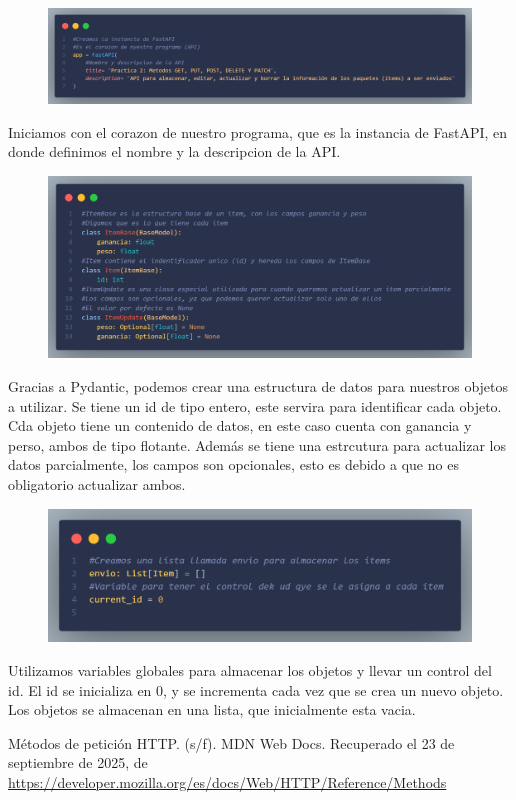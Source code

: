 \documentclass[12pt]{article}
\begin{document}
\begin{figure}[h!]
    \centering
    \includegraphics[width=1\textwidth]{Imagenes/Captura2_corazon del programa.png}
\end{figure}

Iniciamos con el corazon de nuestro programa, que es la instancia de FastAPI, en donde definimos el nombre y la descripcion de la API.\\

\begin{figure}[H]
    \centering
    \includegraphics[width=1\textwidth]{Imagenes/Captura3_esctructuradatos.png}
\end{figure}

Gracias a Pydantic, podemos crear una estructura de datos para nuestros objetos a utilizar.
Se tiene un id de tipo entero, este servira para identificar cada objeto.
Cda objeto tiene un contenido de datos, en este caso cuenta con ganancia y perso, ambos de tipo flotante.
Además se tiene una estrcutura para actualizar los datos parcialmente, los campos son opcionales, esto es debido a que no es obligatorio actualizar ambos.

\begin{figure}[H]
    \centering
    \includegraphics[width=1\textwidth]{Imagenes/Captura4_variablesGlobales.png}
\end{figure}
Utilizamos variables globales para almacenar los objetos y llevar un control del id.
El id se inicializa en 0, y se incrementa cada vez que se crea un nuevo objeto.
Los objetos se almacenan en una lista, que inicialmente esta vacia.


\begin{thebibliography}{1}
 Métodos de petición HTTP. (s/f). MDN Web Docs. Recuperado el 23 de septiembre de 2025, de \url{https://developer.mozilla.org/es/docs/Web/HTTP/Reference/Methods}

\end{thebibliography}
\end{document}

